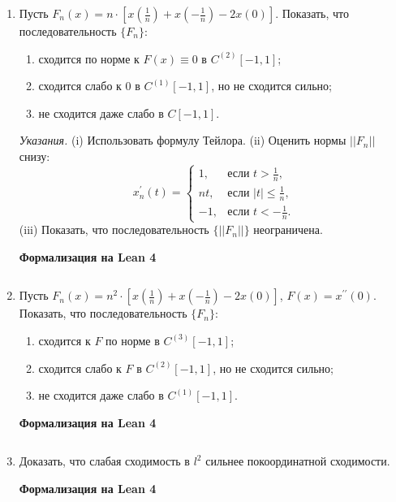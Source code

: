 \documentclass[12pt,a4paper]{article}
\begin{document}
\begin{enumerate}
\newpage

\item Пусть $F_{n}(x) = n \cdot \left[x(\frac{1}{n}) + x(-\frac{1}{n}) - 2x(0)\right]$. Показать, что последовательность $\{F_{n}\}$:
\begin{enumerate}[label=\alph*)]
\item сходится по норме к $F(x) \equiv 0$ в $C^{(2)}[-1,1]$;
\item сходится слабо к $0$ в $C^{(1)}[-1,1]$, но не сходится сильно;
\item не сходится даже слабо в $C[-1,1]$.
\end{enumerate}
\textit{Указания.} (i) Использовать формулу Тейлора. (ii) Оценить нормы $||F_{n}||$ снизу:
$$x_{n}^{\prime}(t) =
\begin{cases} 1, & \text{если } t > \frac{1}{n}, \\ nt, & \text{если } |t| \le \frac{1}{n}, \\ -1, & \text{если } t < -\frac{1}{n}.
\end{cases}$$
(iii) Показать, что последовательность $\{||F_{n}||\}$ неограничена.


\begin{center}\small\textbf{Формализация на Lean 4}\end{center}
\newpage
\inputminted{lean}{FunAn/Section17_HahnBanach/Task05.lean}

\newpage

\item Пусть $F_{n}(x) = n^{2} \cdot \left[x(\frac{1}{n}) + x(-\frac{1}{n}) - 2x(0)\right]$, $F(x) = x^{\prime\prime}(0)$. Показать, что последовательность $\{F_{n}\}$:
\begin{enumerate}[label=\alph*)]
\item сходится к $F$ по норме в $C^{(3)}[-1,1]$;
\item сходится слабо к $F$ в $C^{(2)}[-1,1]$, но не сходится сильно;
\item не сходится даже слабо в $C^{(1)}[-1,1]$.
\end{enumerate}


\begin{center}\small\textbf{Формализация на Lean 4}\end{center}
\inputminted{lean}{FunAn/Section17_HahnBanach/Task06.lean}

\newpage
\item Доказать, что слабая сходимость в $l^{2}$ сильнее покоординатной сходимости.


\begin{center}\small\textbf{Формализация на Lean 4}\end{center}
\inputminted{lean}{FunAn/Section17_HahnBanach/Task07.lean}


\end{enumerate}
\end{document}
